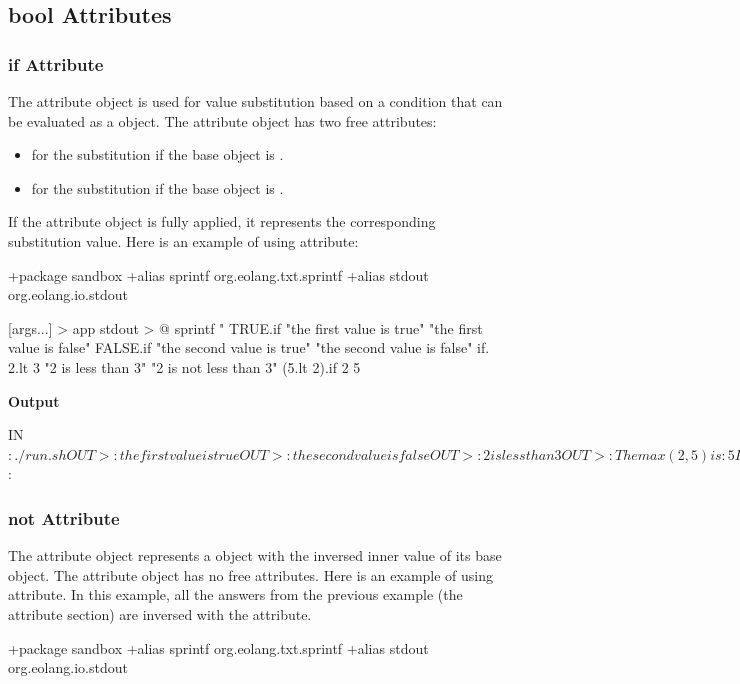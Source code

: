 \documentclass[12pt]{book}
\begin{document}
{\subsection{bool Attributes}

\subsubsection{if Attribute}
The  attribute object is used for value substitution based on a condition that can be evaluated as a  object.
The  attribute object has two free attributes:
\begin{itemize}
    \item {} for the substitution if the base  object is .
    \item {} for the substitution if the base  object is .
\end{itemize}
If the  attribute object is fully applied, it represents the corresponding substitution value. Here is an example of using  attribute:
\begin{ffcode}
+package sandbox
+alias sprintf org.eolang.txt.sprintf
+alias stdout org.eolang.io.stdout

[args...] > app
  stdout > @
    sprintf
      "%
      TRUE.if
        "the first value is true"
        "the first value is false"
      FALSE.if
        "the second value is true"
        "the second value is false"
      if.
        2.lt 3
        "2 is less than 3"
        "2 is not less than 3"
      (5.lt 2).if
        2
        5
\end{ffcode}
\textbf{Output}
\begin{ffcode}
IN$: ./run.sh
OUT>: the first value is true
OUT>: the second value is false
OUT>: 2 is less than 3
OUT>: The max(2, 5) is: 5
IN$:
\end{ffcode}

\subsubsection{not Attribute}
The  attribute object represents a  object with the inversed inner value of its base  object.
The  attribute object has no free attributes. Here is an example of using  attribute.
In this example, all the answers from the previous example (the  attribute section) are inversed with the  attribute.

\begin{ffcode}
+package sandbox
+alias sprintf org.eolang.txt.sprintf
+alias stdout org.eolang.io.stdout


\end{ffcode}}
\end{document}
